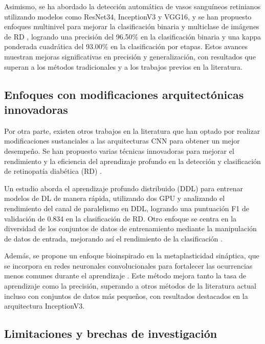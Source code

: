Asimismo, se ha abordado la detección automática de vasos sanguíneos retinianos utilizando modelos como ResNet34, InceptionV3 y VGG16, y se han propuesto enfoques multinivel  para mejorar la clasificación binaria y multiclase de imágenes de RD , logrando una precisión del 96.50\% en la clasificación binaria y una kappa ponderada cuadrática del 93.00\% en la clasificación por etapas. Estos avances muestran mejoras significativas en precisión y generalización, con resultados que superan a los métodos tradicionales y a los trabajos previos en la literatura.

\subsection{Enfoques con modificaciones arquitectónicas innovadoras}

Por otra parte, existen otros trabajos en la literatura que han optado por realizar modificaciones sustanciales a las arquitecturas CNN para obtener un mejor desempeño. Se han propuesto varias técnicas innovadoras para mejorar el rendimiento y la eficiencia del aprendizaje profundo en la detección y clasificación de retinopatía diabética (RD) .

Un estudio aborda el aprendizaje profundo distribuido (DDL) para entrenar modelos de DL de manera rápida, utilizando dos GPU y analizando el rendimiento del canal de paralelismo en DDL, logrando una puntuación F1 de validación de 0.834 en la clasificación de RD. Otro enfoque se centra en la diversidad de los conjuntos de datos de entrenamiento mediante la manipulación de datos de entrada, mejorando así el rendimiento de la clasificación .

Además, se propone un enfoque bioinspirado en la metaplasticidad sináptica, que se incorpora en redes neuronales convolucionales para fortalecer las ocurrencias menos comunes durante el aprendizaje . Este método mejora tanto la tasa de aprendizaje como la precisión, superando a otros métodos de la literatura actual incluso con conjuntos de datos más pequeños, con resultados destacados en la arquitectura InceptionV3.

\subsection{Limitaciones y brechas de investigación}

